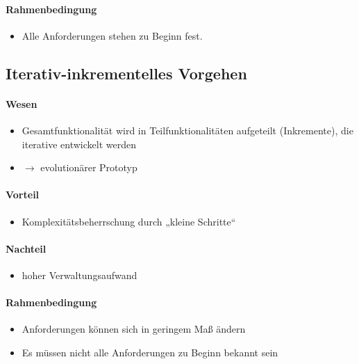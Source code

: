 \paragraph{Rahmenbedingung}
\begin{itemize}
\item Alle Anforderungen stehen zu Beginn fest.
\end{itemize}

\subsection{Iterativ-inkrementelles Vorgehen}
\paragraph{Wesen} 
\begin{itemize}
\item Gesamtfunktionalität wird in Teilfunktionalitäten aufgeteilt (Inkremente), die iterative entwickelt werden\\
\item[]$\to$ evolutionärer Prototyp
\end{itemize}

\paragraph{Vorteil}
\begin{itemize}
\item Komplexitätsbeherrschung durch „kleine Schritte“
\end{itemize}

\paragraph{Nachteil}
\begin{itemize}
\item hoher Verwaltungsaufwand
\end{itemize}

\paragraph{Rahmenbedingung}
\begin{itemize}
\item Anforderungen können sich in geringem Maß ändern
\item Es müssen nicht alle Anforderungen zu Beginn bekannt sein
\end{itemize}

